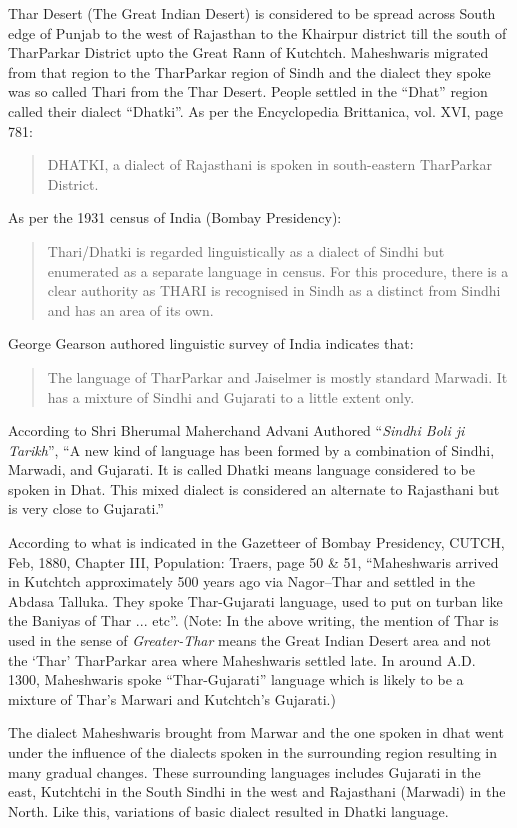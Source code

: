 Thar Desert (The Great Indian Desert) is considered to be spread across South edge of Punjab to the west of Rajasthan to the Khairpur district till the south of TharParkar District upto the Great Rann of Kutchtch. Maheshwaris migrated from that region to the TharParkar region of Sindh and the dialect they spoke was so called Thari from the Thar Desert. People settled in the ``Dhat'' region called their dialect ``Dhatki''. As per the Encyclopedia Brittanica, vol. XVI, page 781:
\begin{quote}
 DHATKI, a dialect of Rajasthani is spoken in south-eastern TharParkar District.
\end{quote}
As per the 1931 census of India (Bombay Presidency):
\begin{quote}
Thari/Dhatki is regarded linguistically as a dialect of Sindhi but enumerated as a separate language in census. For this procedure, there is a clear authority as THARI is recognised in Sindh as a distinct from Sindhi and has an area of its own.
\end{quote}
George Gearson authored linguistic survey of India indicates that:
\begin{quote}
The language of TharParkar and Jaiselmer is mostly standard Marwadi. It has a mixture of Sindhi and Gujarati to a little extent only.
\end{quote}
According to Shri Bherumal Maherchand Advani Authored ``\textit{Sindhi Boli ji Tarikh}'', ``A new kind of language has been formed by a combination of Sindhi, Marwadi, and Gujarati. It is called Dhatki means language considered to be spoken in Dhat. This mixed dialect is considered an alternate to Rajasthani but is very close to Gujarati.''

According to what is indicated in the Gazetteer of Bombay Presidency, CUTCH, Feb, 1880, Chapter III, Population: Traers, page 50 \& 51, ``Maheshwaris arrived in Kutchtch approximately 500 years ago via Nagor--Thar and settled in the Abdasa Talluka. They spoke Thar-Gujarati language, used to put on turban like the Baniyas of Thar ... etc''. (Note: In the above writing, the mention of Thar is used in the sense of \textit{Greater-Thar} means the Great Indian Desert area and not the `Thar' TharParkar area where Maheshwaris settled late. In around A.D. 1300, Maheshwaris spoke ``Thar-Gujarati'' language which is likely to be a mixture of Thar's Marwari and Kutchtch's Gujarati.)

The dialect Maheshwaris brought from Marwar and the one spoken in dhat went under the influence of the dialects spoken in the surrounding region resulting in many gradual changes. These surrounding languages includes Gujarati in the east, Kutchtchi in the South Sindhi in the west and Rajasthani (Marwadi) in the North. Like this, variations of basic dialect resulted in Dhatki language.

